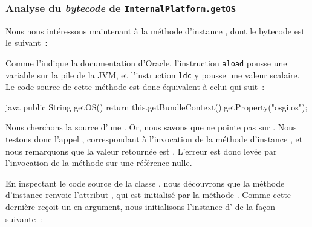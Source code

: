 \subsubsection{Analyse du \textit{bytecode} de \texttt{InternalPlatform.getOS}}

Nous nous intéressons maintenant à la méthode d'instance , dont le bytecode est le suivant~:


Comme l'indique la documentation d'Oracle, l'instruction \texttt{aload} \cite{javaaload} pousse une variable sur la pile de la JVM, et l'instruction %
\texttt{ldc} \cite{javaldc} y pousse une valeur scalaire.
Le code source de cette méthode est donc équivalent à celui qui suit~:

\begin{imtaCode}{java}
public String getOS() {
    return this.getBundleContext().getProperty("osgi.os");
}
\end{imtaCode}

Nous cherchons la source d'une .
Or, nous savons que  ne pointe pas sur .
Nous testons donc l'appel , correspondant à l'invocation de la méthode d'instance %
, et nous remarquons que la valeur retournée est .
L'erreur  est donc levée par l'invocation de la méthode  sur une référence nulle.

En inspectant le code source de la classe , nous découvrons que la méthode d'instance  renvoie l'attribut , %
qui est initialisé par la méthode .
Comme cette dernière reçoit un  en argument, nous initialisons l'instance d' de la façon suivante~:

